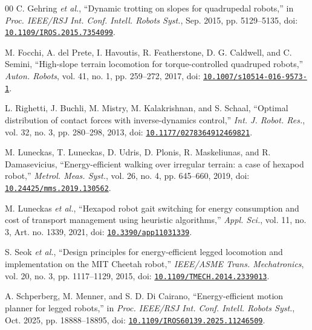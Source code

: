 \documentclass{ieeeaccess}
\begin{document}
\begin{thebibliography}{00}
C. Gehring \emph{et al.}, \textquotedblleft{}Dynamic trotting on slopes for quadrupedal robots,\textquotedblright{} in \emph{Proc. IEEE/RSJ Int. Conf. Intell. Robots Syst.}, Sep. 2015, pp. 5129--5135, doi: \href{https://doi.org/10.1109/IROS.2015.7354099}{\nolinkurl{10.1109/IROS.2015.7354099}}.

M. Focchi, A. del Prete, I. Havoutis, R. Featherstone, D. G. Caldwell, and C. Semini, \textquotedblleft{}High-slope terrain locomotion for torque-controlled quadruped robots,\textquotedblright{} \emph{Auton. Robots}, vol. 41, no. 1, pp. 259--272, 2017, doi: \href{https://doi.org/10.1007/s10514-016-9573-1}{\nolinkurl{10.1007/s10514-016-9573-1}}.

\newpage
{}
L. Righetti, J. Buchli, M. Mistry, M. Kalakrishnan, and S. Schaal, \textquotedblleft{}Optimal distribution of contact forces with inverse-dynamics control,\textquotedblright{} \emph{Int. J. Robot. Res.}, vol. 32, no. 3, pp. 280--298, 2013, doi: \href{https://doi.org/10.1177/0278364912469821}{\nolinkurl{10.1177/0278364912469821}}.

M. Luneckas, T. Luneckas, D. Udris, D. Plonis, R. Maskeliunas, and R. Damasevicius, \textquotedblleft{}Energy-efficient walking over irregular terrain: a case of hexapod robot,\textquotedblright{} \emph{Metrol. Meas. Syst.}, vol. 26, no. 4, pp. 645--660, 2019, doi: \href{https://doi.org/10.24425/mms.2019.130562}{\nolinkurl{10.24425/mms.2019.130562}}.

M. Luneckas \emph{et al.}, \textquotedblleft{}Hexapod robot gait switching for energy consumption and cost of transport management using heuristic algorithms,\textquotedblright{} \emph{Appl. Sci.}, vol. 11, no. 3, Art. no. 1339, 2021, doi: \href{https://doi.org/10.3390/app11031339}{\nolinkurl{10.3390/app11031339}}.

S. Seok \emph{et al.}, \textquotedblleft{}Design principles for energy-efficient legged locomotion and implementation on the MIT Cheetah robot,\textquotedblright{} \emph{IEEE/ASME Trans. Mechatronics}, vol. 20, no. 3, pp. 1117--1129, 2015, doi: \href{https://doi.org/10.1109/TMECH.2014.2339013}{\nolinkurl{10.1109/TMECH.2014.2339013}}.

A. Schperberg, M. Menner, and S. D. Di Cairano, \textquotedblleft{}Energy-efficient motion planner for legged robots,\textquotedblright{} in \emph{Proc. IEEE/RSJ Int. Conf. Intell. Robots Syst.}, Oct. 2025, pp. 18888--18895, doi: \href{https://doi.org/10.1109/IROS60139.2025.11246509}{\nolinkurl{10.1109/IROS60139.2025.11246509}}.


\end{thebibliography}
\end{document}
